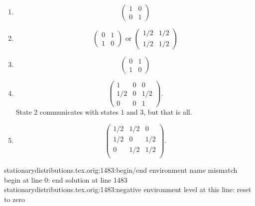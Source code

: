 \documentclass[12pt]{article}
\begin{document}
\begin{solution}
    \begin{enumerate}[label=(\alph*)]
    \item
        \[
            \begin{pmatrix}
                1 & 0 \\
                0 & 1
            \end{pmatrix}
        \]
    \item
        \[
            \begin{pmatrix}
                0 & 1 \\
                1 & 0
            \end{pmatrix}
            \text{ or }
            \begin{pmatrix}
                1/2 & 1/2 \\
                1/2 & 1/2
            \end{pmatrix}
        \]
    \item
        \[
            \begin{pmatrix}
                0 & 1 \\
                1 & 0
            \end{pmatrix}
        \]
    \item
        \[
            \begin{pmatrix}
                1 & 0 & 0 \\
                1/2 & 0 & 1/2 \\
                0 &0 & 1
            \end{pmatrix}
            .
        \] State \( 2 \) communicates with states \( 1 \) and \( 3 \),
        but that is all.
    \item
        \[
            \begin{pmatrix}
                1/2 & 1/2 & 0 \\
                1/2 & 0 & 1/2 \\
                0 & 1/2 & 1/2 \\
            \end{pmatrix}
            .
        \]
\end{enumerate}
stationarydistributions.tex.orig:1483:begin/end environment name mismatch
	begin {} at line 0: end {solution} at line 1483
stationarydistributions.tex.orig:1483:negative environment level at this line: reset to zero
\end{solution}
\end{document}
